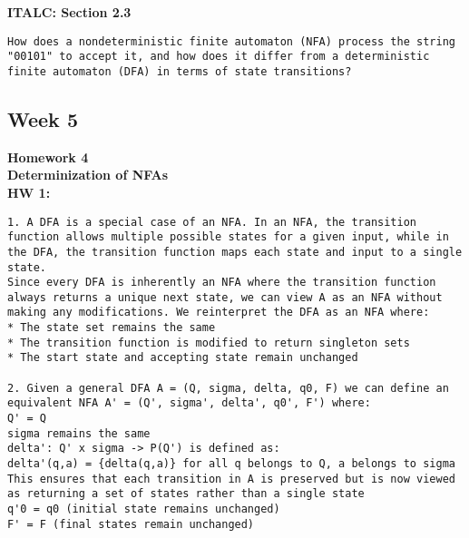 \documentclass{article}
\theoremstyle{theorem}
\theoremstyle{definition}
\theoremstyle{remark}
\begin{document}
\textbf{ITALC: Section 2.3}
\begin{lstlisting}
How does a nondeterministic finite automaton (NFA) process the string "00101" to accept it, and how does it differ from a deterministic finite automaton (DFA) in terms of state transitions?
\end{lstlisting}

\subsection{Week 5}
\textbf{Homework 4} \\
\textbf{Determinization of NFAs} \\
\textbf{HW 1:} 
\begin{lstlisting}
1. A DFA is a special case of an NFA. In an NFA, the transition function allows multiple possible states for a given input, while in the DFA, the transition function maps each state and input to a single state.
Since every DFA is inherently an NFA where the transition function always returns a unique next state, we can view A as an NFA without making any modifications. We reinterpret the DFA as an NFA where:
* The state set remains the same
* The transition function is modified to return singleton sets
* The start state and accepting state remain unchanged

2. Given a general DFA A = (Q, sigma, delta, q0, F) we can define an equivalent NFA A' = (Q', sigma', delta', q0', F') where:
Q' = Q
sigma remains the same
delta': Q' x sigma -> P(Q') is defined as:
delta'(q,a) = {delta(q,a)} for all q belongs to Q, a belongs to sigma
This ensures that each transition in A is preserved but is now viewed as returning a set of states rather than a single state
q'0 = q0 (initial state remains unchanged)
F' = F (final states remain unchanged)
\end{lstlisting}
\end{document}

